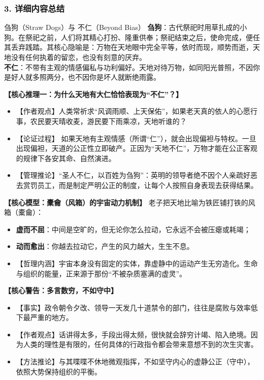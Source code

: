\subsubsection{3. 详细内容总结}

\begin{ConceptBox}{刍狗（Straw Dogs）与 不仁（Beyond Bias）}
\textbf{刍狗}：古代祭祀时用草扎成的小狗。在祭祀之前，人们将其精心打扮、隆重供奉；祭祀结束之后，使命完成，便任其丢弃践踏。其核心隐喻是：万物在天地眼中完全平等，依时而现，顺势而逝，天地没有任何执着的留恋，也没有刻意的厌弃。\\
\textbf{不仁}：不带有主观的情感偏私与功利偏好。天地对待万物，如同阳光普照，不因你是好人就多照两分，也不因你是坏人就断绝雨露。
\end{ConceptBox}

\noindent\textbf{【核心推理一：为什么天地有大仁恰恰表现为“不仁”？】}
\begin{itemize}
    \item 【作者观点】人类常祈求“风调雨顺、上天保佑”，如果老天真的依人的心愿行事，农民要天晴收麦，游民要下雨乘凉，天地听谁的？
    \item 【论证过程】
    如果天地有主观情感（所谓“仁”），就会出现偏袒与特权。一旦出现偏袒，天道的公正性立即破产。正因为“天地不仁”，万物才能在公正客观的规律下各安其命、自然演进。
    \item 【管理推论】“圣人不仁，以百姓为刍狗”：英明的领导者绝不因个人亲疏好恶去赏罚员工，而是制定严明公正的制度，让每个人按照自身表现去获得结果。
\end{itemize}

\noindent\textbf{【核心模型：橐龠（风箱）的宇宙动力机制】}
老子把天地比喻为铁匠铺打铁的风箱（橐龠）：
\begin{itemize}
    \item \textbf{虚而不屈}：中间是空旷的，但无论你怎么拉动，它永远不会被压瘪或耗竭；
    \item \textbf{动而愈出}：你越去拉动它，产生的风力越大，生生不息。
    \item 【哲理内涵】宇宙本身没有固定的实体，靠虚静中的运动产生无穷造化。生命与组织的能量，正来源于那份“不被杂质塞满的虚灵”。
\end{itemize}

\noindent\textbf{【核心警告：多言数穷，不如守中】}
\begin{itemize}
    \item 【事实】政令朝令夕改、领导一天发几十道禁令的部门，往往是腐败与效率低下最严重的地方。
    \item 【作者观点】话讲得太多，手段出得太频，很快就会辞穷计竭、陷入绝境。因为人类的理性是有限的，任何具体的行政指令都会带来意想不到的次生灾害。
    \item 【方法推论】与其喋喋不休地微观指挥，不如坚守内心的虚静公正（守中），依照大势保持组织的平衡。
\end{itemize}

